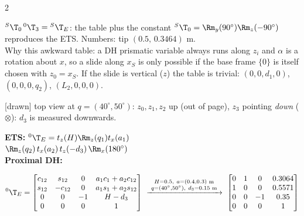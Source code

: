\begin{multicols}{2}
\begin{worked}
${}^S\T_0\,{}^0\T_3={}^S\T_E$: the table plus the constant ${}^S\T_0=\Rm_y(90^\circ)\Rm_z(-90^\circ)$ reproduces the ETS. Numbers: tip $(0.5,\,0.3464)$ m. \chk\\
Why this awkward table: a DH prismatic variable always runs along $z_i$ and $\alpha$ is a rotation about $x$, so a slide along $x_S$ is only possible if the base frame $\{0\}$ is itself chosen with $z_0=x_S$. If the slide is vertical ($z$) the table is trivial: $(0,0,d_1,0)$, $(0,0,0,q_2)$, $(L_2,0,0,0)$.
\end{worked}

\begin{worked}
\begin{minipage}[c]{0.42\linewidth}\centering
{}\par{\sffamily\scriptsize\color{slate}[drawn] top view at $q=(40^\circ,50^\circ)$: $z_0,z_1,z_2$ up (out of page), $z_3$ pointing \emph{down} ($\otimes$): $d_3$ is measured downwards.}
\end{minipage}\hfill
\begin{minipage}[c]{0.55\linewidth}
\textbf{ETS:} ${}^0\T_E=t_z(H)\Rm_z(q_1)t_x(a_1)$\\ $\Rm_z(q_2)\,t_x(a_2)\,t_z(-d_3)\,\Rm_x(180^\circ)$\\[3pt]
\textbf{Proximal DH:}\\
\end{minipage}
\[{}^0\T_E=\begin{bmatrix}c_{12}&s_{12}&0&a_1c_1+a_2c_{12}\\s_{12}&-c_{12}&0&a_1s_1+a_2s_{12}\\0&0&-1&H-d_3\\0&0&0&1\end{bmatrix}\ \xrightarrow{\ \substack{H=0.5,\ a=(0.4,0.3)\text{ m}\\ q=(40^\circ,50^\circ),\ d_3=0.15\text{ m}}\ }\ \begin{bmatrix}0&1&0&0.3064\\1&0&0&0.5571\\0&0&-1&0.35\\0&0&0&1\end{bmatrix}\]

\end{worked}
\end{multicols}
